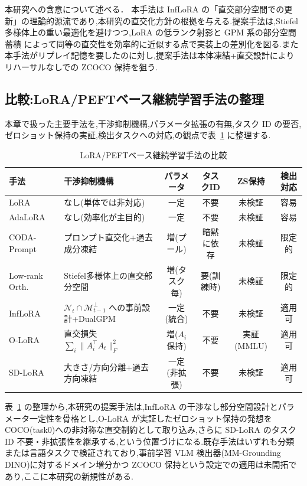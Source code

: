 本研究への含意について述べる．
本手法は InfLoRA \cite{inflora} の「直交部分空間での更新」の理論的源流であり,本研究の直交化方針の根拠を与える.提案手法は,Stiefel 多様体上の重い最適化を避けつつ,LoRA の低ランク射影と GPM 系の部分空間蓄積 \cite{gpm} によって同等の直交性を効率的に近似する点で実装上の差別化を図る.また本手法がリプレイ記憶を要したのに対し,提案手法は本体凍結+直交設計によりリハーサルなしでの ZCOCO 保持を狙う.

\subsection{比較:LoRA/PEFTベース継続学習手法の整理}

本章で扱った主要手法を,干渉抑制機構,パラメータ拡張の有無,タスク ID の要否,ゼロショット保持の実証,検出タスクへの対応,の観点で表~\ref{tab:lora_cl_compare} に整理する.

\begin{table}[t]
\centering
\caption{LoRA/PEFTベース継続学習手法の比較}
\label{tab:lora_cl_compare}
\begin{tabularx}{\linewidth}{l X c c c c}
\hline
手法 & 干渉抑制機構 & パラメータ & タスクID & ZS保持 & 検出対応 \\
\hline
LoRA \cite{lora} & なし(単体では非対応) & 一定 & 不要 & 未検証 & 容易 \\
AdaLoRA \cite{adalora} & なし(効率化が主目的) & 一定 & 不要 & 未検証 & 容易 \\
CODA-Prompt \cite{codaprompt} & プロンプト直交化+過去成分凍結 & 増(プール) & 暗黙に依存 & 未検証 & 限定的 \\
Low-rank Orth.\ \cite{lowrankorth} & Stiefel多様体上の直交部分空間 & 増(タスク毎) & 要(訓練時) & 未検証 & 限定的 \\
InfLoRA \cite{inflora} & $\mathcal{N}_t \cap \mathcal{M}_{t-1}^{\perp}$ への事前設計+DualGPM & 一定(統合) & 不要 & 未検証 & 適用可 \\
O-LoRA \cite{olora} & 直交損失 $\sum_i \|A_i^\top A_t\|_F^2$ & 増($A_i$保持) & 不要 & 実証(MMLU) & 適用可 \\
SD-LoRA \cite{sdlora} & 大きさ/方向分離+過去方向凍結 & 一定(非拡張) & 不要 & 未検証 & 適用可 \\
\hline
\end{tabularx}
\end{table}

表~\ref{tab:lora_cl_compare} の整理から,本研究の提案手法は,InfLoRA \cite{inflora} の干渉なし部分空間設計とパラメータ一定性を骨格とし,O-LoRA \cite{olora} が実証したゼロショット保持の発想を COCO(task0)への非対称な直交制約として取り込み,さらに SD-LoRA \cite{sdlora} のタスク ID 不要・非拡張性を継承する,という位置づけになる.既存手法はいずれも分類または言語タスクで検証されており,事前学習 VLM 検出器(MM-Grounding DINO)に対するドメイン増分かつ ZCOCO 保持という設定での適用は未開拓であり,ここに本研究の新規性がある.
